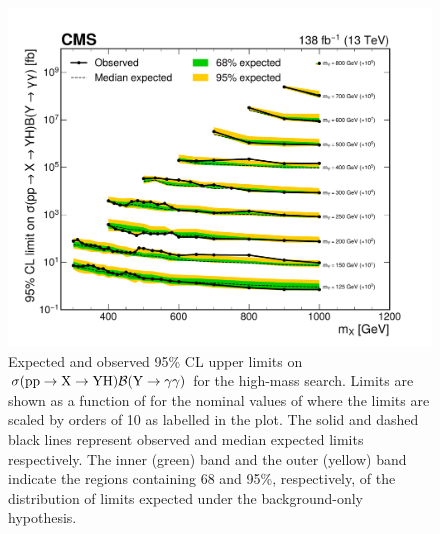 \begin{figure}
    \centering
    \includegraphics[width=\textwidth]{Figures/Dihiggs/results/limits/limits_stack_my_y_gg_high_mass_paper.pdf}
    \caption[High-Mass \XYggHtt Upper Limits in as Function of \mX in Slices of \mY]{Expected and observed 95\% CL upper limits on $\sigma(\mathrm{p}\mathrm{p} \to \mathrm{X} \to \mathrm{Y}\mathrm{H})\mathcal{B}(\mathrm{Y} \to \gamma\gamma)$ for the high-mass \XYggHtt search. Limits are shown as a function of \mX for the nominal values of \mY where the limits are scaled by orders of 10 as labelled in the plot. The solid and dashed black lines represent observed and median expected limits respectively. The inner (green) band and the outer (yellow) band indicate the regions containing 68 and 95\%, respectively, of the distribution of limits expected under the background-only hypothesis.}\label{fig:limits_stack_my_y_gg_high_mass}
\end{figure}